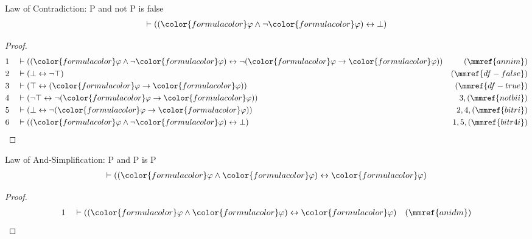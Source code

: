 \begin{lemma} Law of Contradiction:  P and not P
is false
\begin{align}
\vdash ( ( {\color{formulacolor}\varphi} \wedge \lnot
    {\color{formulacolor}\varphi} ) \leftrightarrow \bot
    )\label{bl.PandNotPisFalse}
\end{align}
\end{lemma}

\begin{proof}
\begin{align}
  1 && & \vdash ( ( {\color{formulacolor}\varphi} \wedge \lnot
      {\color{formulacolor}\varphi} ) \leftrightarrow \lnot
      ( {\color{formulacolor}\varphi} \rightarrow
      {\color{formulacolor}\varphi} )
      )&(\mmref{annim})\notag
  \\ 2 && & \vdash ( \bot \leftrightarrow \lnot \top
      )&(\mmref{df-false})\notag
  \\ 3 && & \vdash ( \top \leftrightarrow ( {\color{formulacolor}\varphi}
      \rightarrow {\color{formulacolor}\varphi} )
      )&(\mmref{df-true})\notag
  \\ 4 && & \vdash ( \lnot \top \leftrightarrow \lnot (
      {\color{formulacolor}\varphi} \rightarrow
      {\color{formulacolor}\varphi} )
      )&3,(\mmref{notbii})\notag
  \\ 5 && & \vdash ( \bot \leftrightarrow \lnot ( {\color{formulacolor}\varphi}
      \rightarrow {\color{formulacolor}\varphi} )
      )&2,4,(\mmref{bitri})\notag
  \\ 6 && & \vdash ( ( {\color{formulacolor}\varphi} \wedge \lnot
      {\color{formulacolor}\varphi} ) \leftrightarrow \bot
      )&1,5,(\mmref{bitr4i})\notag
\end{align}
\end{proof}

\begin{lemma} Law of And-Simplification:  P and P is P
\begin{align}
\vdash ( ( {\color{formulacolor}\varphi} \wedge {\color{formulacolor}\varphi} )
    \leftrightarrow {\color{formulacolor}\varphi} )\label{bl.PandPisP}
\end{align}
\end{lemma}

\begin{proof}
\begin{align}
  1 && & \vdash ( ( {\color{formulacolor}\varphi} \wedge
      {\color{formulacolor}\varphi} ) \leftrightarrow
      {\color{formulacolor}\varphi}
      )&(\mmref{anidm})\notag
\end{align}
\end{proof}

